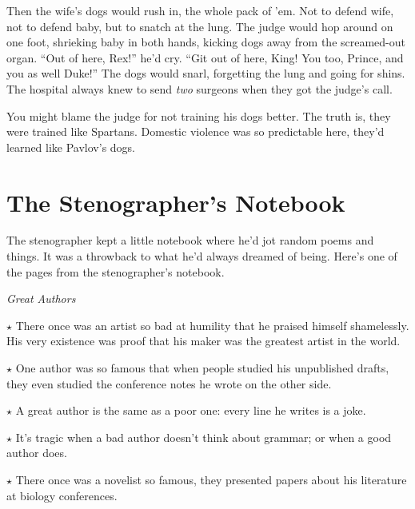 \documentclass[oneside]{book}
\begin{document}
Then the wife's dogs would rush in, the whole pack of 'em.  Not to defend
wife, not to defend baby, but to snatch at the lung.  The judge would hop around
on one foot, shrieking baby in both hands,
kicking dogs away from the screamed-out organ.
``Out of here, Rex!'' he'd cry.  ``Git out of here, King!
You too, Prince, and you as well Duke!''  The dogs would snarl, forgetting the
lung and going for shins.  The hospital always knew to send \emph{two}
surgeons when they got the judge's call.

You might blame the judge for not training his dogs better.
The truth is, they were trained like Spartans.
Domestic violence was so predictable here, they'd learned like Pavlov's dogs.

\chapter{The Stenographer's Notebook}


The stenographer kept a little notebook where he'd jot random
poems and things.  It was a throwback to what he'd always dreamed
of being.  Here's one of the pages from the stenographer's notebook.

\vspace{2mm}
\noindent \textit{Great Authors}

$\star$ There once was an artist so bad at humility that he praised himself
shamelessly.  His very existence was proof that his maker was the greatest
artist in the world.



$\star$ One author was so famous that when people studied his
unpublished drafts, they even studied the conference notes
he wrote on the other side.

$\star$ A great author is the same as a poor one: every line he writes is a joke.

$\star$ It's tragic when a bad author doesn't think about grammar; or when a
good author does.

$\star$ There once was a novelist so famous, they presented papers about
his literature at biology conferences.
\end{document}
